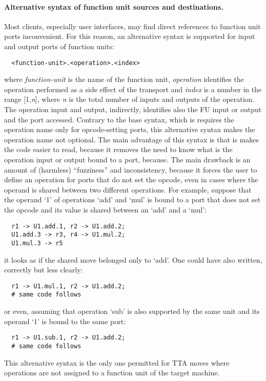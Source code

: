 \documentclass[twoside]{tceusermanual}
\begin{document}
\paragraph{Alternative syntax of function unit sources and destinations.}
Most clients, especially user interfaces, may find direct references to
function unit ports inconvenient. For this reason, an alternative syntax is
supported for input and output ports of function units:
\begin{verbatim}
  <function-unit>.<operation>.<index>
\end{verbatim}
where \emph{function-unit} is the name of the function unit,
\emph{operation} identifies the operation performed as a side effect of the
transport and \emph{index} is a number in the range [1,\emph{n}], where
\emph{n} is the total number of inputs and outputs of the operation.
%
The operation input and output, indirectly, identifies also the FU input or
output and the port accessed.  Contrary to the base syntax, which is
requires the operation name only for opcode-setting ports, this alternative
syntax makes the operation name not optional.
%
The main advantage of this syntax is that is makes the code easier to read,
because it removes the need to know what is the operation input or output
bound to a port, because.  The main drawback is an amount of (harmless)
``fuzziness'' and inconsistency, because it forces the user to define an
operation for ports that do not set the opcode, even in cases where the
operand is shared between two different operations.  For example, suppose
that the operand `1' of operations `add' and `mul' is bound to a port that
does not set the opcode and its value is shared between an `add' and a
`mul':
\begin{verbatim}
  r1 -> U1.add.1, r2 -> U1.add.2;
  U1.add.3 -> r3, r4 -> U1.mul.2;
  U1.mul.3 -> r5
\end{verbatim}
it looks as if the shared move belonged only to `add'. One could have also
written, correctly but less clearly:
\begin{verbatim}
  r1 -> U1.mul.1, r2 -> U1.add.2;
  # same code follows
\end{verbatim}
or even, assuming that operation `sub' is also supported by the same unit
and its operand `1' is bound to the same port:
\begin{verbatim}
  r1 -> U1.sub.1, r2 -> U1.add.2;
  # same code follows
\end{verbatim}

This alternative syntax is the only one permitted for TTA moves where
operations are not assigned to a function unit of the target machine.
\end{document}
